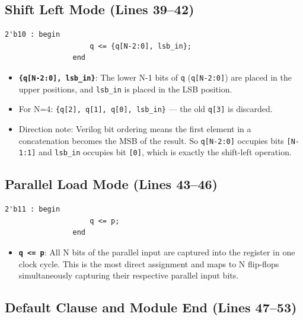\documentclass[12pt,a4paper]{report}
\begin{document}
\subsection{Shift Left Mode (Lines 39--42)}

\begin{lstlisting}[firstnumber=39, caption={Case statement: Shift Left mode}]
                2'b10 : begin
                    q <= {q[N-2:0], lsb_in};
                end
\end{lstlisting}

\begin{itemize}
    \item \textbf{\texttt{\{q[N-2:0], lsb\_in\}}}: The lower N-1 bits of \texttt{q} (\texttt{q[N-2:0]}) are placed in the upper positions, and \texttt{lsb\_in} is placed in the LSB position.
    \item For N=4: \texttt{\{q[2], q[1], q[0], lsb\_in\}} — the old \texttt{q[3]} is discarded.
    \item Direction note: Verilog bit ordering means the first element in a concatenation becomes the MSB of the result. So \texttt{q[N-2:0]} occupies bits \texttt{[N-1:1]} and \texttt{lsb\_in} occupies bit \texttt{[0]}, which is exactly the shift-left operation.
\end{itemize}

\subsection{Parallel Load Mode (Lines 43--46)}

\begin{lstlisting}[firstnumber=43, caption={Case statement: Parallel Load mode}]
                2'b11 : begin
                    q <= p;
                end
\end{lstlisting}

\begin{itemize}
    \item \textbf{\texttt{q <= p}}: All N bits of the parallel input are captured into the register in one clock cycle. This is the most direct assignment and maps to N flip-flops simultaneously capturing their respective parallel input bits.
\end{itemize}

\subsection{Default Clause and Module End (Lines 47--53)}
\end{document}
